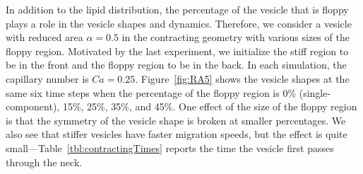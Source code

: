 \documentclass[twoside,twocolumn,9pt]{article}
\begin{document}

In addition to the lipid distribution, the percentage of the vesicle
that is floppy plays a role in the vesicle shapes and dynamics.
Therefore, we consider a vesicle with reduced area $\alpha = 0.5$ in the
contracting geometry with various sizes of the floppy region. Motivated
by the last experiment, we initialize the stiff region to be in the
front and the floppy region to be in the back. In each simulation, the
capillary number is $Ca = 0.25$. Figure~\ref{fig:RA5} shows the vesicle
shapes at the same six time steps when the percentage of the floppy
region is 0\% (single-component), 15\%, 25\%, 35\%, and 45\%. One effect
of the size of the floppy region is that the symmetry of the vesicle
shape is broken at smaller percentages. We also see that stiffer
vesicles have faster migration speeds, but the effect is quite
small---Table~\ref{tbl:contractingTimes} reports the time the vesicle
first passes through the neck.
\end{document}
